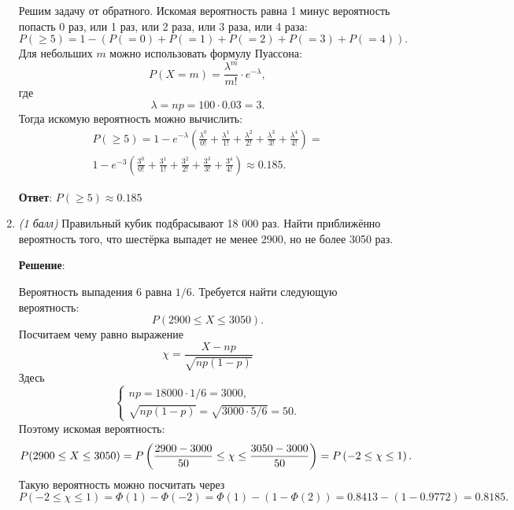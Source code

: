 \documentclass{article}
\begin{document}
\begin{enumerate}
    Решим задачу от обратного. Искомая вероятность равна 1 минус вероятность попасть 0 раз, или 1 раз, или 2 раза, или 3 раза, или 4 раза:
    \begin{equation}
        P(\geq 5) = 1 - (P(=0) + P(=1) + P(=2) + P(=3) + P(=4)).
    \end{equation}
    Для небольших $m$ можно использовать формулу Пуассона:
    \begin{equation}
        P(X = m) = \frac{\lambda^m}{m!}\cdot e^{-\lambda},
    \end{equation}
    где
    \begin{equation}
        \lambda = np = 100 \cdot 0.03 = 3.
    \end{equation}
    Тогда искомую вероятность можно вычислить:
    \begin{eqnarray}
        P(\geq 5) = 1 - e^{-\lambda}(\frac{\lambda^0}{0!} + \frac{\lambda^1}{1!} + \frac{\lambda^2}{2!} + \frac{\lambda^3}{3!} + \frac{\lambda^4}{4!}) = \\
        1 - e^{-3}(\frac{3^0}{0!} + \frac{3^1}{1!} + \frac{3^2}{2!} + \frac{3^3}{3!} + \frac{3^4}{4!}) \approx 0.185.
    \end{eqnarray}

    \textbf{Ответ}:
    $P(\geq 5) \approx 0.185$
    
    \item \textit{(1 балл)} Правильный кубик подбрасывают 18 000 раз. Найти приближённо вероятность того, что шестёрка выпадет не менее 2900, но не более 3050 раз.
    

    \textbf{Решение}:

    Вероятность выпадения 6 равна $1/6$. Требуется найти следующую вероятность:
    \begin{equation}
        P(2900 \leq X \leq 3050).
    \end{equation}
    Посчитаем чему равно выражение
    $$\chi = \frac{X-np}{\sqrt{np(1-p)}}$$
    Здесь
    \begin{equation}
        \begin{cases}
            np = 18000 \cdot 1/6 = 3000,\\
            \sqrt{np(1-p)} = \sqrt{3000\cdot5/6} = 50.
        \end{cases}
    \end{equation}
    Поэтому искомая вероятность:
    \begin{equation}
        P(2900 \leq X \leq 3050) = P\left(\frac{2900 - 3000}{50} \leq \chi \leq \frac{3050 - 3000}{50}\right) = \\
        P\left(-2 \leq \chi \leq 1\right).
    \end{equation}
    Такую вероятность можно посчитать через
    \begin{equation}
        P\left(-2 \leq \chi \leq 1\right) = \Phi(1) - \Phi(-2) = \Phi(1) - (1 - \Phi(2)) = 0.8413 - (1 - 0.9772) = 0.8185.
    \end{equation}


\end{enumerate}
\end{document}
